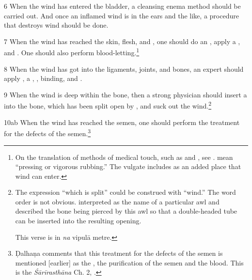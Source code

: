 \begin{translation}
    \item [6] When the wind has entered the bladder, a cleansing enema method
should be carried out. And once an inflamed wind is in the ears and the like,
a procedure that destroys wind should be done.

    \item [7]
    When the wind has reached the skin, flesh, and , one should do 
    an 
    , apply a ,  
     and . One should also 
    perform blood-letting.\footnote{On the translation of methods of 
    medical touch, such as  and , see 
    \cite[122--131]{broo-2021}.   mean “pressing or 
    vigorous rubbing.”  The vulgate includes 
     as an added place that wind can enter.}

    \item[8]
    When the wind has got into the ligaments, joints, and bones, an expert 
    should apply  ,  a ,
    , binding, and .


    \item [9] When the wind is deep within the bone, then a strong physician
should insert a  into the bone, which has been split open by
, and suck out the wind.\footnote{The
    expression “which is split” could be construed with “wind.”  The word order
    is not obvious.   interpreted  as the
    name of a particular awl and described the bone being pierced by this awl so
    that a double-headed tube can be inserted into the resulting opening.
    
    This verse is in \emph{na} vipulā metre.}
         
         
          

    \item[10ab]
    When the wind has reached the semen, one should perform the treatment 
    for the defects of the semen.\footnote{Ḍalhaṇa comments 
    \citep[421]{vulgate} that this treatment for the defects of the semen is 
    mentioned [earlier] as the , the purification of the 
    semen and the blood. This is the \emph{Śārīrasthāna} Ch. 2, 
    .}
    

\end{translation}

